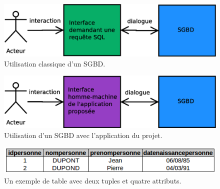 \begin{figure}[!h]
  \centering
  \includegraphics[width=14cm]{images/sans_idb.eps}
  \caption{Utilisation classique d'un SGBD.}
  \label{sans_idb_schema}
\end{figure}

\begin{figure}[!h]
  \centering
  \includegraphics[width=14cm]{images/avec_idb.eps}
  \caption{Utilisation d'un SGBD avec l'application du projet.}
  \label{avec_idb_schema}
\end{figure}

\begin{figure}[!h]
  \centering
  \includegraphics[width=14cm]{images/exemple_table.png}
  \caption{Un exemple de table avec deux tuples et quatre attributs.}
  \label{exemple_table}
\end{figure}
